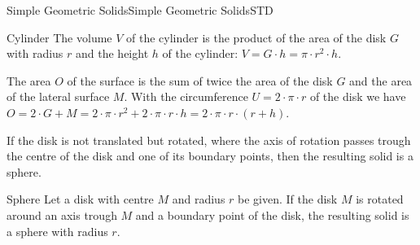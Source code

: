 \begin{MXContent}{Simple Geometric Solids}{Simple Geometric Solids}{STD}
\begin{MXInfo}{Cylinder}
The volume $V$ of the cylinder is the product of the area of the disk 
$G$ with radius $r$ and the height $h$ of the cylinder: $V = G \cdot h = \pi \cdot r^2 \cdot h$.

The area $O$ of the surface is the sum of twice the area of the disk $G$ and 
the area of the lateral surface $M$. With the circumference $U = 2 \cdot \pi \cdot r$
of the disk we have $O = 2 \cdot G + M = 2 \cdot \pi \cdot r^2 + 2 \cdot \pi \cdot r \cdot h %
 = 2 \cdot \pi \cdot r \cdot (r + h)$.
\end{MXInfo}


If the disk is not translated but rotated, where the axis of rotation passes 
trough the centre of the disk and one of its boundary points, then the resulting 
solid is a sphere.


\begin{MXInfo}{Sphere}
Let a disk with centre $M$ and radius $r$ be given. If the disk $M$ is 
rotated around an axis trough $M$ and a boundary point of the disk, the resulting 
solid is a sphere with radius $r$.

\begin{center}
\end{center}


\end{MXInfo}
\end{MXContent}
